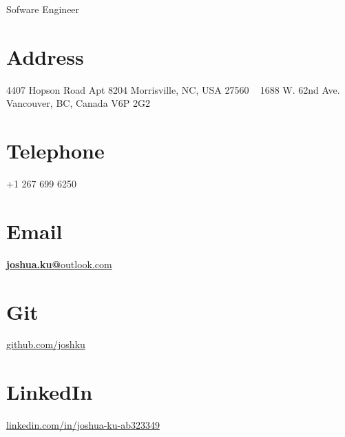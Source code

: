 \documentclass[]{friggeri-cv}
\begin{document}
      {Sofware Engineer}


\begin{aside}
  \section{Address}
    4407 Hopson Road Apt 8204
    Morrisville, NC, USA 27560
    ~
    1688 W. 62nd Ave.
    Vancouver, BC, Canada V6P 2G2
    ~
  \section{Telephone}
    +1 267 699 6250
    ~
  \section{Email}
    \href{mailto:joshua.ku@outlook.com}{\textbf{joshua.ku@}outlook.com}
    ~
  \section{Git}
    \href{https://github.com/joshku}{github.com/joshku}
    ~
  \section{LinkedIn}
    \href{https://www.linkedin.com/in/joshua-ku-ab323349/}{linkedin.com/in/joshua-ku-ab323349}
    ~

\end{aside}
\end{document}
